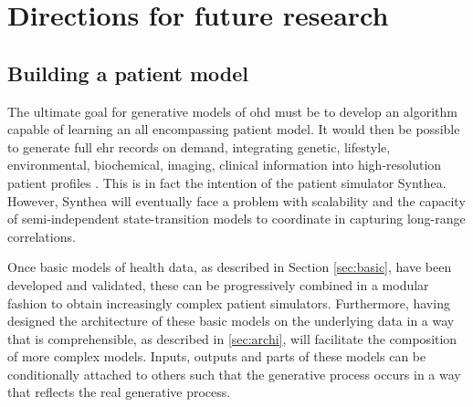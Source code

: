 \section{Directions for future research}
\subsection{Building a patient model}
The ultimate goal for generative models of \gls{ohd} must be to develop an algorithm capable of learning an all encompassing patient model. It would then be possible to generate full \gls{ehr} records on demand, integrating genetic, lifestyle, environmental, biochemical, imaging, clinical information into high-resolution patient profiles \cite{Capobianco2020}. This is in fact the intention of the patient simulator Synthea. However, Synthea will eventually face a problem with scalability and the capacity of semi-independent state-transition models to coordinate in capturing long-range correlations.\par

Once basic models of health data, as described in Section \ref{sec:basic}, have been developed and validated, these can be progressively combined in a modular fashion to obtain increasingly complex patient simulators. Furthermore, having designed the architecture of these basic models on the underlying data in a way that is comprehensible, as described in \ref{sec:archi}, will facilitate the composition of more complex models. Inputs, outputs and parts of these models can be conditionally attached to others such that the generative process occurs in a way that reflects the real generative process.


